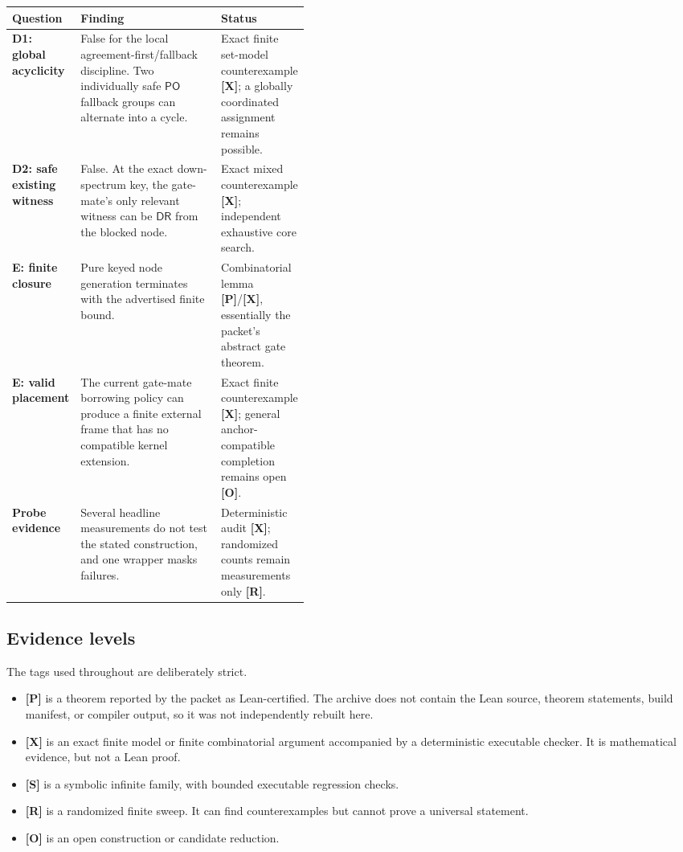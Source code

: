 \documentclass[11pt]{article}
\newcommand{\PO}{\mathsf{PO}}
\newcommand{\DR}{\mathsf{DR}}
\newcommand{\evP}{\textbf{[P]}}
\newcommand{\evX}{\textbf{[X]}}
\newcommand{\evS}{\textbf{[S]}}
\newcommand{\evR}{\textbf{[R]}}
\newcommand{\evO}{\textbf{[O]}}
\begin{document}
\begin{center}
\renewcommand{\arraystretch}{1.3}
\begin{tabularx}{\linewidth}{>{\bfseries}p{0.20\linewidth}X>{\raggedright\arraybackslash}p{0.23\linewidth}}
\toprule
Question & Finding & Status \\
\midrule
D1: global acyclicity & False for the local agreement-first/fallback discipline.
Two individually safe $\PO$ fallback groups can alternate into a cycle. & Exact finite
set-model counterexample \evX; a globally coordinated assignment remains possible. \\
D2: safe existing witness & False. At the exact down-spectrum key, the gate-mate's
only relevant witness can be $\DR$ from the blocked node. & Exact mixed
counterexample \evX; independent exhaustive core search. \\
E: finite closure & Pure keyed node generation terminates with the advertised finite
bound. & Combinatorial lemma \evP/\evX, essentially the packet's abstract gate theorem. \\
E: valid placement & The current gate-mate borrowing policy can produce a finite
external frame that has no compatible kernel extension. & Exact finite counterexample
\evX; general anchor-compatible completion remains open \evO. \\
Probe evidence & Several headline measurements do not test the stated construction,
and one wrapper masks failures. & Deterministic audit \evX; randomized counts remain
measurements only \evR. \\
\bottomrule
\end{tabularx}
\end{center}

\subsection{Evidence levels}

The tags used throughout are deliberately strict.

\begin{itemize}
  \item \evP{} is a theorem reported by the packet as Lean-certified. The archive does
        not contain the Lean source, theorem statements, build manifest, or compiler
        output, so it was not independently rebuilt here.
  \item \evX{} is an exact finite model or finite combinatorial argument accompanied by
        a deterministic executable checker. It is mathematical evidence, but not a Lean
        proof.
  \item \evS{} is a symbolic infinite family, with bounded executable regression checks.
  \item \evR{} is a randomized finite sweep. It can find counterexamples but cannot prove
        a universal statement.
  \item \evO{} is an open construction or candidate reduction.
\end{itemize}
\end{document}
